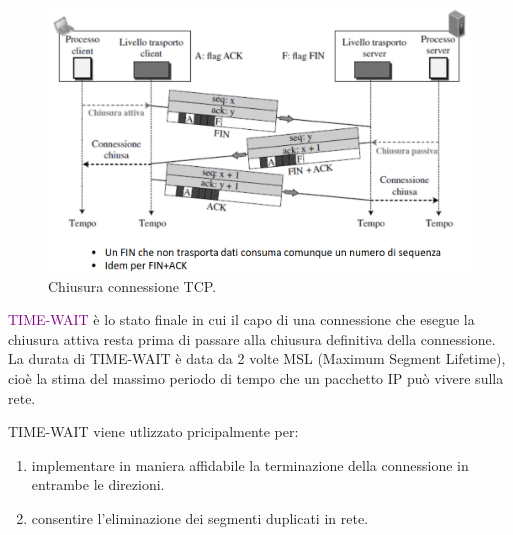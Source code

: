 \begin{figure}[h]
    \centering
    \includegraphics[scale=0.35]{Immagini/ChiusuraConnessioneTCP.png}
    \caption{Chiusura connessione TCP.}
\end{figure}

\begin{definition} 
    \textcolor{purple}{TIME-WAIT} è lo stato finale in cui il capo di una connessione che esegue la chiusura attiva resta prima di passare alla chiusura definitiva della connessione.
    La durata di TIME-WAIT è data da 2 volte MSL (Maximum Segment Lifetime), cioè la stima del massimo periodo di tempo che un pacchetto IP può vivere sulla rete.
\end{definition}

TIME-WAIT viene utlizzato pricipalmente per:
\begin{enumerate}
    \item implementare in maniera affidabile la terminazione della connessione in entrambe le direzioni.
    \item consentire l'eliminazione dei segmenti duplicati in rete.
\end{enumerate}

\newpage

